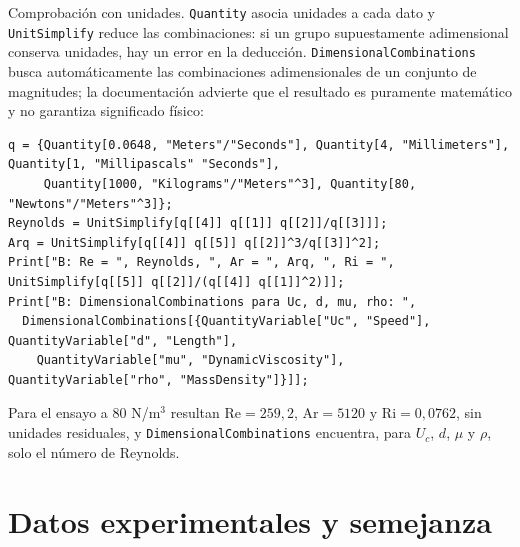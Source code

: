 \documentclass[10pt,openany]{book}
\begin{document}
Comprobación con unidades. \texttt{Quantity} asocia unidades a cada dato y \texttt{UnitSimplify} reduce las combinaciones: si un grupo supuestamente adimensional conserva unidades, hay un error en la deducción. \texttt{DimensionalCombinations} busca automáticamente las combinaciones adimensionales de un conjunto de magnitudes; la documentación advierte que el resultado es puramente matemático y no garantiza significado físico:
\begin{lstlisting}[style=studium]
q = {Quantity[0.0648, "Meters"/"Seconds"], Quantity[4, "Millimeters"], Quantity[1, "Millipascals" "Seconds"],
     Quantity[1000, "Kilograms"/"Meters"^3], Quantity[80, "Newtons"/"Meters"^3]};
Reynolds = UnitSimplify[q[[4]] q[[1]] q[[2]]/q[[3]]];
Arq = UnitSimplify[q[[4]] q[[5]] q[[2]]^3/q[[3]]^2];
Print["B: Re = ", Reynolds, ", Ar = ", Arq, ", Ri = ", UnitSimplify[q[[5]] q[[2]]/(q[[4]] q[[1]]^2)]];
Print["B: DimensionalCombinations para Uc, d, mu, rho: ",
  DimensionalCombinations[{QuantityVariable["Uc", "Speed"], QuantityVariable["d", "Length"],
    QuantityVariable["mu", "DynamicViscosity"], QuantityVariable["rho", "MassDensity"]}]];
\end{lstlisting}
Para el ensayo a 80 N/m\(^3\) resultan \(\mathrm{Re} = 259{,}2\), \(\mathrm{Ar} = 5120\) y \(\mathrm{Ri} = 0{,}0762\), sin unidades residuales, y \texttt{DimensionalCombinations} encuentra, para \(U_c\), \(d\), \(\mu\) y \(\rho\), solo el número de Reynolds.

\section{Datos experimentales y semejanza}
\end{document}

